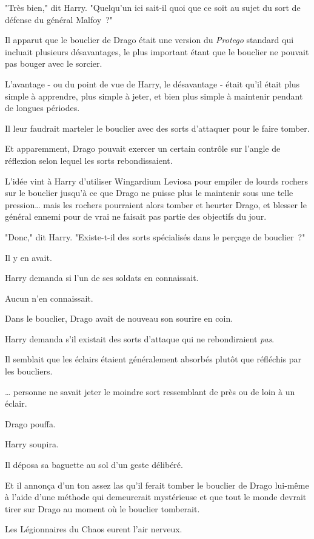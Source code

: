 "Très bien," dit Harry. "Quelqu'un ici sait-il quoi que ce soit au sujet du sort de défense du général Malfoy~?"

Il apparut que le bouclier de Drago était une version du \emph{Protego} standard qui incluait plusieurs désavantages, le plus important étant que le bouclier ne pouvait pas bouger avec le sorcier.

L'avantage - ou du point de vue de Harry, le désavantage - était qu'il était plus simple à apprendre, plus simple à jeter, et bien plus simple à maintenir pendant de longues périodes.

Il leur faudrait marteler le bouclier avec des sorts d'attaquer pour le faire tomber.

Et apparemment, Drago pouvait exercer un certain contrôle sur l'angle de réflexion selon lequel les sorts rebondissaient.

L'idée vint à Harry d'utiliser Wingardium Leviosa pour empiler de lourds rochers sur le bouclier jusqu'à ce que Drago ne puisse plus le maintenir sous une telle pression… mais les rochers pourraient alors tomber et heurter Drago, et blesser le général ennemi pour de vrai ne faisait pas partie des objectifs du jour.

"Donc," dit Harry. "Existe-t-il des sorts spécialisés dans le perçage de bouclier~?"

Il y en avait.

Harry demanda si l'un de ses soldats en connaissait.

Aucun n'en connaissait.

Dans le bouclier, Drago avait de nouveau son sourire en coin.

Harry demanda s'il existait des sorts d'attaque qui ne rebondiraient \emph{pas}.

Il semblait que les éclairs étaient généralement absorbés plutôt que réfléchis par les boucliers.

… personne ne savait jeter le moindre sort ressemblant de près ou de loin à un éclair.

Drago pouffa.

Harry soupira.

Il déposa sa baguette au sol d'un geste délibéré.

Et il annonça d'un ton assez las qu'il ferait tomber le bouclier de Drago lui-même à l'aide d'une méthode qui demeurerait mystérieuse et que tout le monde devrait tirer sur Drago au moment où le bouclier tomberait.

Les Légionnaires du Chaos eurent l'air nerveux.

